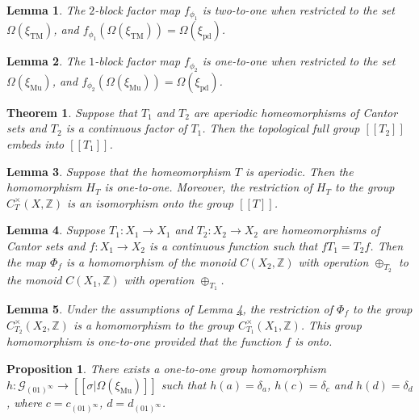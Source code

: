 \documentclass[10pt,a4paper]{amsart}
\newtheorem{lemma}{Lemma}
\newtheorem{theorem}{Theorem}
\newtheorem{proposition}{Proposition}
\def\Om{\Omega}
\def\bZ{\mathbb{Z}}
\def\cG{\mathcal{G}}
\def\de{\delta}
\def\si{\sigma}
\def\xiGE{\xi_{\mathrm{Mu}}}
\def\xiTM{\xi_{\mathrm{TM}}}
\def\xipd{\xi_{\mathrm{pd}}}
\begin{document}
\begin{lemma}\label{block-factor-1}
The $2$-block factor map $f_{\phi_1}$ is two-to-one when restricted to the 
set $\Om(\xiTM)$, and $f_{\phi_1}(\Om(\xiTM))=\Om(\xipd)$.
\end{lemma}

\begin{lemma}\label{block-factor-2}
The $1$-block factor map $f_{\phi_2}$ is one-to-one when restricted to the 
set $\Om(\xiGE)$, and $f_{\phi_2}(\Om(\xiGE))=\Om(\xipd)$.
\end{lemma}

\begin{theorem}\label{TFG-embeds}
Suppose that $T_1$ and $T_2$ are aperiodic homeomorphisms of Cantor sets 
and $T_2$ is a continuous factor of $T_1$.  Then the topological full group 
$[[T_2]]$ embeds into $[[T_1]]$.
\end{theorem}

\begin{lemma}\label{model-isomorphism}
Suppose that the homeomorphism $T$ is aperiodic.  Then the homomorphism 
$H_T$ is one-to-one.  Moreover, the restriction of $H_T$ to the group 
$C^\times_T(X,\bZ)$ is an isomorphism onto the group $[[T]]$.
\end{lemma}

\begin{lemma}\label{monoid-embed}
Suppose $T_1:X_1\to X_1$ and $T_2:X_2\to X_2$ are homeomorphisms of Cantor 
sets and $f:X_1\to X_2$ is a continuous function such that $fT_1=T_2f$.  
Then the map $\Phi_f$ is a homomorphism of the monoid $C(X_2,\bZ)$ with 
operation $\oplus_{T_2}$ to the monoid $C(X_1,\bZ)$ with operation 
$\oplus_{T_1}$.
\end{lemma}

\begin{lemma}\label{group-embed}
Under the assumptions of Lemma \ref{monoid-embed}, the restriction of 
$\Phi_f$ to the group $C^\times_{T_2}(X_2,\bZ)$ is a homomorphism to the 
group $C^\times_{T_1}(X_1,\bZ)$.  This group homomorphism is one-to-one 
provided that the function $f$ is onto.
\end{lemma}

\begin{proposition}\label{inj-homomorph}
There exists a one-to-one group homomorphism 
$h:\cG_{(01)^\infty}\to[[\si|\Omega(\xiGE)]]$ such that $h(a)=\de_a$, 
$h(c)=\de_c$ and $h(d)=\de_d$, where $c=c_{(01)^\infty}$, 
$d=d_{(01)^\infty}$.
\end{proposition}
\end{document}
